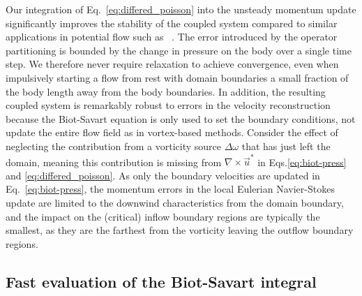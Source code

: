\documentclass[11pt]{article}
\begin{document}
Our integration of Eq.~\ref{eq:differed_poisson} into the unsteady momentum update significantly improves the stability of the coupled system compared to similar applications in potential flow such as ~\cite{Miller2008AnBoundaries}. The error introduced by the operator partitioning is bounded by the change in pressure on the body over a single time step. We therefore never require relaxation to achieve convergence, even when impulsively starting a flow from rest with domain boundaries a small fraction of the body length away from the body boundaries. 
In addition, the resulting coupled system is remarkably robust to errors in the velocity reconstruction because the Biot-Savart equation is only used to set the boundary conditions, not update the entire flow field as in vortex-based methods. Consider the effect of neglecting the contribution from a vorticity source $\Delta\omega$ that has just left the domain, meaning this contribution is missing from $\nabla\times\vec u^*$ in Eqs.\ref{eq:biot-press} and \ref{eq:differed_poisson}. As only the boundary velocities are updated in Eq.~\ref{eq:biot-press}, the momentum errors in the local Eulerian Navier-Stokes update are limited to the downwind characteristics from the domain boundary, and the impact on the (critical) inflow boundary regions are typically the smallest, as they are the farthest from the vorticity leaving the outflow boundary regions. 


\subsection{Fast evaluation of the Biot-Savart integral}
\end{document}
